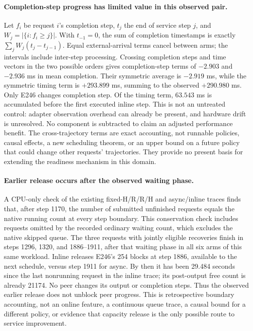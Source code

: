\documentclass[10pt,a4paper]{article}
\begin{document}
\paragraph{Completion-step progress has limited value in this observed pair.}
Let $f_i$ be request $i$'s completion step, $t_j$ the end of service step $j$,
and $W_j=|\{i:f_i\geq j\}|$. With $t_{-1}=0$, the sum of completion timestamps
is exactly $\sum_j W_j(t_j-t_{j-1})$. Equal external-arrival terms cancel
between arms; the intervals include inter-step processing. Crossing completion
steps and time vectors in the two possible orders gives completion-step terms
of $-2.903$ and $-2.936$ ms in mean completion. Their symmetric average is
$-2.919$ ms, while the symmetric timing term is $+293.899$ ms, summing to the
observed $+290.980$ ms. Only E246 changes completion step. Of the timing term,
$63.543$ ms is accumulated before the first executed inline step. This is not
an untreated control: adapter observation overhead can already be present,
and hardware drift is unresolved. No component is subtracted to claim an
adjusted performance benefit. The cross-trajectory terms are exact accounting,
not runnable policies, causal effects, a new scheduling theorem, or an upper
bound on a future policy that could change other requests' trajectories.
They provide no present basis for extending the readiness mechanism in this
domain.

\paragraph{Earlier release occurs after the observed waiting phase.}
A CPU-only check of the existing fixed-H/R/R/H and async/inline traces finds
that, after step 1170, the number of submitted unfinished requests equals the
native running count at every step boundary. This conservation check includes
requests omitted by the recorded ordinary waiting count, which excludes the
native skipped queue. The three requests with jointly eligible recoveries
finish in steps 1296, 1320, and 1886--1911, after that waiting phase in all six
arms of this same workload. Inline releases E246's 254 blocks at step 1886,
available to the next schedule, versus step 1911 for async. By then it has been
29.484 seconds since the last nonrunning request in the inline trace; its
post-output free count is already 21174. No peer changes its output or
completion steps. Thus the observed earlier release does not unblock peer
progress. This is retrospective boundary accounting, not an online feature,
a continuous queue trace, a causal bound for a different policy, or evidence
that capacity release is the only possible route to service improvement.
\end{document}
